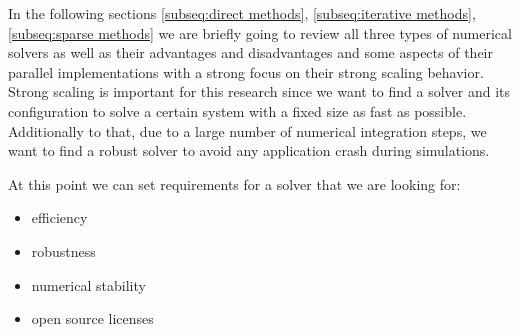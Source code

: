 In the following sections \ref{subseq:direct methods}, \ref{subseq:iterative methods}, \ref{subseq:sparse methods} we are briefly going to review all three types of numerical solvers as well as their advantages and disadvantages and some aspects of their parallel implementations with a strong focus on their strong scaling behavior. Strong scaling is important for this research since we want to find a solver and its configuration to solve a certain system with a fixed size as fast as possible. Additionally to that, due to a large number of numerical integration steps, we want to find a robust solver to avoid any application crash during simulations.

At this point we can set requirements for a solver that we are looking for:

\begin{itemize}
	\item efficiency
	\item robustness
	\item numerical stability
	\item open source licenses
\end{itemize}

